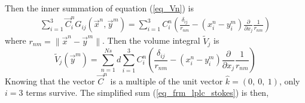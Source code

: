Then the inner summation of equation (\ref{eq_Vn}) is
\begin{align*}
 \sum_{i = 1}^{3}
 	\vec{C}^n_{i} G_{ij}(\vec{x}^n,\vec{y}^m)
 	=  \sum_{i = 1}^{3} {C}^n_{i} 
	\left(
	\frac{\delta_{ij}}{r_{nm}}
	- \left( x_i^n - y_i^m \right)
	 \frac{\partial}{\partial x_j}
	\frac{1}{r_{nm}}
	\right)
\end{align*}
where $r_{nm} = \|\vec{x}^n - \vec{y}^m \|$.
Then the volume integral $\tilde{V}_j$ is 
\begin{equation}
	\tilde{V}_j (\vec{y}^m)=
	\sum_{n=1}^{Ns}
	d
   \sum_{i = 1}^{3} {C}^n_{i} 
  	\left(
  	\frac{\delta_{ij}}{r_{nm}}
  	- \left( x_i^n - y_i^m \right)
  	 \frac{\partial}{\partial x_j}
  	\frac{1}{r_{nm}}
  	\right)
 \label{eq_frm_lplc_stokes}
\end{equation}
Knowing that the vector $\vec{C}^n$ is a multiple of the unit vector $\hat{k} = (0, \ 0, \ 1)$, only $i = 3$ terms survive. The simplified sum (\ref{eq_frm_lplc_stokes}) is then,

